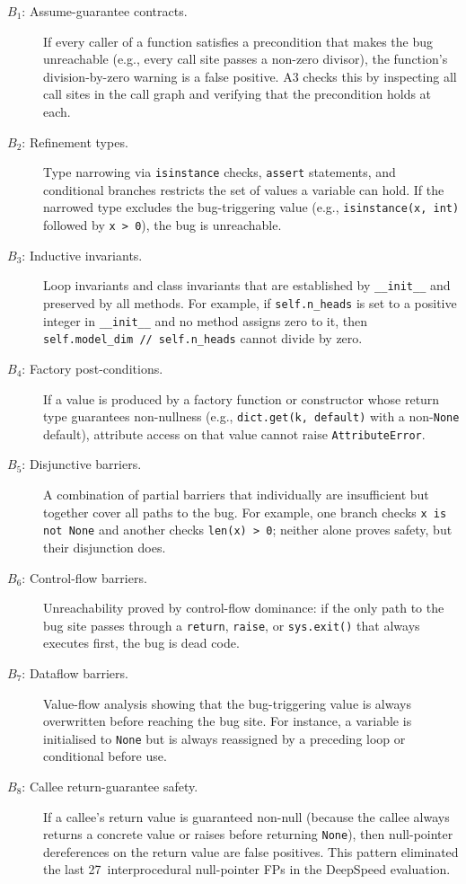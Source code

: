 \documentclass[sigconf,review,anonymous]{acmart}
\begin{document}
\begin{description}
  \item[$B_1$: Assume-guarantee contracts.] If every caller of a function satisfies a precondition that makes the bug unreachable (e.g., every call site passes a non-zero divisor), the function's division-by-zero warning is a false positive.  \textsc{A3} checks this by inspecting all call sites in the call graph and verifying that the precondition holds at each.
  \item[$B_2$: Refinement types.] Type narrowing via \texttt{isinstance} checks, \texttt{assert} statements, and conditional branches restricts the set of values a variable can hold.  If the narrowed type excludes the bug-triggering value (e.g., \texttt{isinstance(x, int)} followed by \texttt{x > 0}), the bug is unreachable.
  \item[$B_3$: Inductive invariants.] Loop invariants and class invariants that are established by \texttt{__init__} and preserved by all methods.  For example, if \texttt{self.n\_heads} is set to a positive integer in \texttt{__init__} and no method assigns zero to it, then \texttt{self.model\_dim // self.n\_heads} cannot divide by zero.
  \item[$B_4$: Factory post-conditions.] If a value is produced by a factory function or constructor whose return type guarantees non-nullness (e.g., \texttt{dict.get(k, default)} with a non-\texttt{None} default), attribute access on that value cannot raise \texttt{AttributeError}.
  \item[$B_5$: Disjunctive barriers.] A combination of partial barriers that individually are insufficient but together cover all paths to the bug.  For example, one branch checks \texttt{x is not None} and another checks \texttt{len(x) > 0}; neither alone proves safety, but their disjunction does.
  \item[$B_6$: Control-flow barriers.] Unreachability proved by control-flow dominance: if the only path to the bug site passes through a \texttt{return}, \texttt{raise}, or \texttt{sys.exit()} that always executes first, the bug is dead code.
  \item[$B_7$: Dataflow barriers.] Value-flow analysis showing that the bug-triggering value is always overwritten before reaching the bug site.  For instance, a variable is initialised to \texttt{None} but is always reassigned by a preceding loop or conditional before use.
  \item[$B_8$: Callee return-guarantee safety.] If a callee's return value is guaranteed non-null (because the callee always returns a concrete value or raises before returning \texttt{None}), then null-pointer dereferences on the return value are false positives.  This pattern eliminated the last 27~interprocedural null-pointer FPs in the DeepSpeed evaluation.
\end{description}
\end{document}
